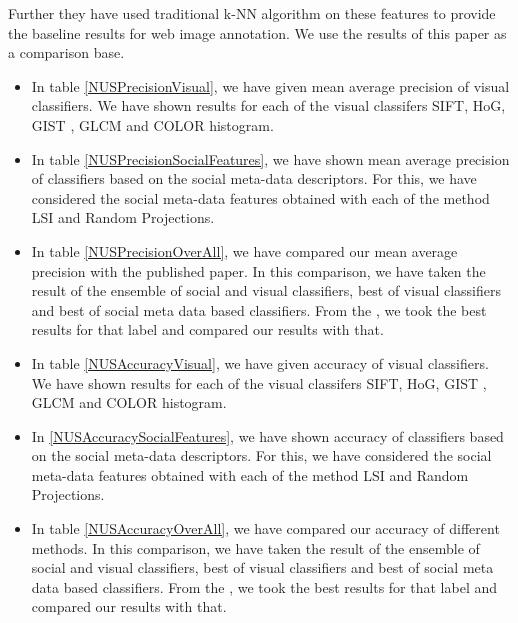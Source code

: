 Further they have used traditional k-NN algorithm  on these features to provide the baseline results for web image annotation. We use the results of this paper as a comparison base. 

\begin{itemize}
\item In table \ref{NUSPrecisionVisual}, we have given mean average precision of visual classifiers. We have shown results for each of the visual classifers SIFT, HoG, GIST , GLCM and COLOR histogram.
\item In table \ref{NUSPrecisionSocialFeatures}, we have shown mean average precision of classifiers based on the social meta-data descriptors. For this, we have considered the social meta-data features obtained with each of the method LSI and Random Projections.
\item In table \ref{NUSPrecisionOverAll}, we have compared our mean average precision with the published paper. In this comparison, we have taken the result of the ensemble of social and visual classifiers,  best of visual classifiers and best of social meta data based classifiers. From the  \citet*{CLEF}, we took the best results for that label and compared our results with that.
\item In table \ref{NUSAccuracyVisual}, we have given accuracy of visual classifiers. We have shown results for each of the visual classifers SIFT, HoG, GIST , GLCM and COLOR histogram.
\item In \ref{NUSAccuracySocialFeatures}, we have shown accuracy of classifiers based on the social meta-data descriptors. For this, we have considered the social meta-data features obtained with each of the method LSI and Random Projections.
\item In table \ref{NUSAccuracyOverAll}, we have compared our accuracy of different methods. In this comparison, we have taken the result of the ensemble of social and visual classifiers,  best of visual classifiers and best of social meta data based classifiers. From the  \citet*{NUS}, we took the best results for that label and compared our results with that.
\end{itemize}

